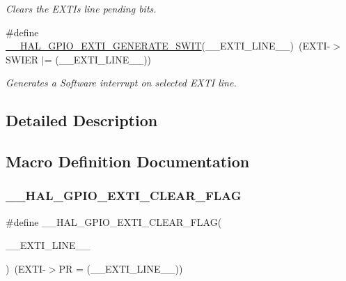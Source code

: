 \begin{DoxyCompactItemize}
\begin{DoxyCompactList}\small\item\em Clears the E\+X\+TI\textquotesingle{}s line pending bits. \end{DoxyCompactList}\item 
\#define \hyperlink{group___g_p_i_o___exported___macros_gac50aef6881e1f76032941ead9c9bce61}{\+\_\+\+\_\+\+H\+A\+L\+\_\+\+G\+P\+I\+O\+\_\+\+E\+X\+T\+I\+\_\+\+G\+E\+N\+E\+R\+A\+T\+E\+\_\+\+S\+W\+IT}(\+\_\+\+\_\+\+E\+X\+T\+I\+\_\+\+L\+I\+N\+E\+\_\+\+\_\+)~(E\+X\+TI-\/$>$S\+W\+I\+ER $\vert$= (\+\_\+\+\_\+\+E\+X\+T\+I\+\_\+\+L\+I\+N\+E\+\_\+\+\_\+))
\begin{DoxyCompactList}\small\item\em Generates a Software interrupt on selected E\+X\+TI line. \end{DoxyCompactList}\end{DoxyCompactItemize}


\subsection{Detailed Description}


\subsection{Macro Definition Documentation}
\mbox{\label{group___g_p_i_o___exported___macros_ga2f28fc349d1812cdc55a77c68d2b278d}} 
\subsubsection{\texorpdfstring{\+\_\+\+\_\+\+H\+A\+L\+\_\+\+G\+P\+I\+O\+\_\+\+E\+X\+T\+I\+\_\+\+C\+L\+E\+A\+R\+\_\+\+F\+L\+AG}{\_\_HAL\_GPIO\_EXTI\_CLEAR\_FLAG}}
{\footnotesize\ttfamily \#define \+\_\+\+\_\+\+H\+A\+L\+\_\+\+G\+P\+I\+O\+\_\+\+E\+X\+T\+I\+\_\+\+C\+L\+E\+A\+R\+\_\+\+F\+L\+AG(\begin{DoxyParamCaption}\item[{}]{\+\_\+\+\_\+\+E\+X\+T\+I\+\_\+\+L\+I\+N\+E\+\_\+\+\_\+ }\end{DoxyParamCaption})~(E\+X\+TI-\/$>$PR = (\+\_\+\+\_\+\+E\+X\+T\+I\+\_\+\+L\+I\+N\+E\+\_\+\+\_\+))}



